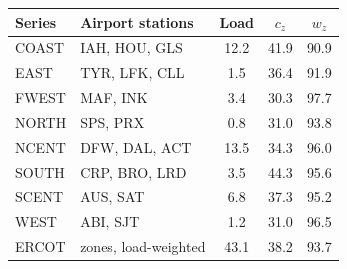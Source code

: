 \begin{tabular}{@{}llccc@{}}
\toprule
Series & Airport stations & Load & $c_z$ & $w_z$ \\
\midrule
COAST & IAH, HOU, GLS & 12.2 & 41.9 & 90.9 \\
EAST & TYR, LFK, CLL & 1.5 & 36.4 & 91.9 \\
FWEST & MAF, INK & 3.4 & 30.3 & 97.7 \\
NORTH & SPS, PRX & 0.8 & 31.0 & 93.8 \\
NCENT & DFW, DAL, ACT & 13.5 & 34.3 & 96.0 \\
SOUTH & CRP, BRO, LRD & 3.5 & 44.3 & 95.6 \\
SCENT & AUS, SAT & 6.8 & 37.3 & 95.2 \\
WEST & ABI, SJT & 1.2 & 31.0 & 96.5 \\
ERCOT & zones, load-weighted & 43.1 & 38.2 & 93.7 \\
\bottomrule
\end{tabular}
